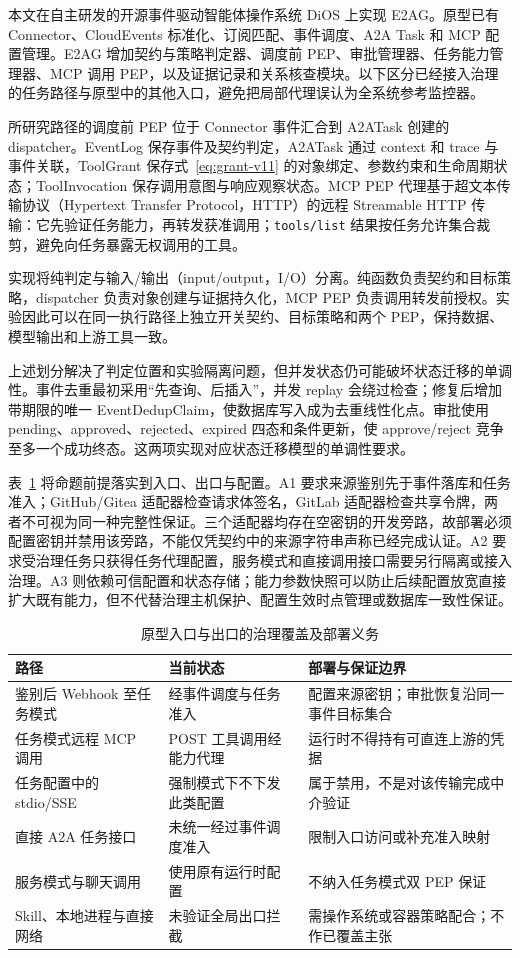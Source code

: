 本文在自主研发的开源事件驱动智能体操作系统 DiOS 上实现 E2AG。原型已有 Connector、CloudEvents 标准化、订阅匹配、事件调度、A2A Task 和 MCP 配置管理。E2AG 增加契约与策略判定器、调度前 PEP、审批管理器、任务能力管理器、MCP 调用 PEP，以及证据记录和关系核查模块。以下区分已经接入治理的任务路径与原型中的其他入口，避免把局部代理误认为全系统参考监控器。

所研究路径的调度前 PEP 位于 Connector 事件汇合到 A2ATask 创建的 dispatcher。EventLog 保存事件及契约判定，A2ATask 通过 context 和 trace 与事件关联，ToolGrant 保存式~\eqref{eq:grant-v11} 的对象绑定、参数约束和生命周期状态；ToolInvocation 保存调用意图与响应观察状态。MCP PEP 代理基于超文本传输协议（Hypertext Transfer Protocol，HTTP）的远程 Streamable HTTP 传输：它先验证任务能力，再转发获准调用；\texttt{tools/list} 结果按任务允许集合裁剪，避免向任务暴露无权调用的工具。

实现将纯判定与输入/输出（input/output，I/O）分离。纯函数负责契约和目标策略，dispatcher 负责对象创建与证据持久化，MCP PEP 负责调用转发前授权。实验因此可以在同一执行路径上独立开关契约、目标策略和两个 PEP，保持数据、模型输出和上游工具一致。

上述划分解决了判定位置和实验隔离问题，但并发状态仍可能破坏状态迁移的单调性。事件去重最初采用“先查询、后插入”，并发 replay 会绕过检查；修复后增加带期限的唯一 EventDedupClaim，使数据库写入成为去重线性化点。审批使用 pending、approved、rejected、expired 四态和条件更新，使 approve/reject 竞争至多一个成功终态。这两项实现对应状态迁移模型的单调性要求。

表~\ref{tab:entry-exit-rr022} 将命题前提落实到入口、出口与配置。A1 要求来源鉴别先于事件落库和任务准入；GitHub/Gitea 适配器检查请求体签名，GitLab 适配器检查共享令牌，两者不可视为同一种完整性保证。三个适配器均存在空密钥的开发旁路，故部署必须配置密钥并禁用该旁路，不能仅凭契约中的来源字符串声称已经完成认证。A2 要求受治理任务只获得任务代理配置，服务模式和直接调用接口需要另行隔离或接入治理。A3 则依赖可信配置和状态存储；能力参数快照可以防止后续配置放宽直接扩大既有能力，但不代替治理主机保护、配置生效时点管理或数据库一致性保证。

\begin{table}[htbp]
\centering
\caption{原型入口与出口的治理覆盖及部署义务}
\label{tab:entry-exit-rr022}
\small
\begin{tabular}{p{37mm}p{44mm}p{56mm}}
\toprule
路径 & 当前状态 & 部署与保证边界 \\
\midrule
鉴别后 Webhook 至任务模式 & 经事件调度与任务准入 & 配置来源密钥；审批恢复沿同一事件目标集合 \\
任务模式远程 MCP 调用 & POST 工具调用经能力代理 & 运行时不得持有可直连上游的凭据 \\
任务配置中的 stdio/SSE & 强制模式下不下发此类配置 & 属于禁用，不是对该传输完成中介验证 \\
直接 A2A 任务接口 & 未统一经过事件调度准入 & 限制入口访问或补充准入映射 \\
服务模式与聊天调用 & 使用原有运行时配置 & 不纳入任务模式双 PEP 保证 \\
Skill、本地进程与直接网络 & 未验证全局出口拦截 & 需操作系统或容器策略配合；不作已覆盖主张 \\
\bottomrule
\end{tabular}
\end{table}

